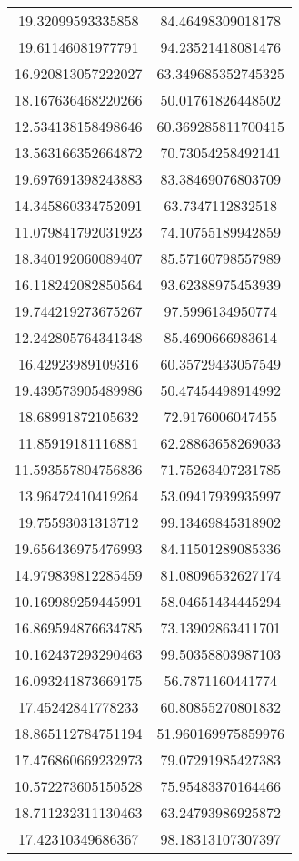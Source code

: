 \begin{table}
\begin{tabular}{cc}
19.32099593335858 & 84.46498309018178 \\
19.61146081977791 & 94.23521418081476 \\
16.920813057222027 & 63.349685352745325 \\
18.167636468220266 & 50.01761826448502 \\
12.534138158498646 & 60.369285811700415 \\
13.563166352664872 & 70.73054258492141 \\
19.697691398243883 & 83.38469076803709 \\
14.345860334752091 & 63.7347112832518 \\
11.079841792031923 & 74.10755189942859 \\
18.340192060089407 & 85.57160798557989 \\
16.118242082850564 & 93.62388975453939 \\
19.744219273675267 & 97.5996134950774 \\
12.242805764341348 & 85.4690666983614 \\
16.42923989109316 & 60.35729433057549 \\
19.439573905489986 & 50.47454498914992 \\
18.68991872105632 & 72.9176006047455 \\
11.85919181116881 & 62.28863658269033 \\
11.593557804756836 & 71.75263407231785 \\
13.96472410419264 & 53.09417939935997 \\
19.75593031313712 & 99.13469845318902 \\
19.656436975476993 & 84.11501289085336 \\
14.979839812285459 & 81.08096532627174 \\
10.169989259445991 & 58.04651434445294 \\
16.869594876634785 & 73.13902863411701 \\
10.162437293290463 & 99.50358803987103 \\
16.093241873669175 & 56.7871160441774 \\
17.45242841778233 & 60.80855270801832 \\
18.865112784751194 & 51.960169975859976 \\
17.476860669232973 & 79.07291985427383 \\
10.572273605150528 & 75.95483370164466 \\
18.711232311130463 & 63.24793986925872 \\
17.42310349686367 & 98.18313107307397 \\

\end{tabular}
\end{table}
